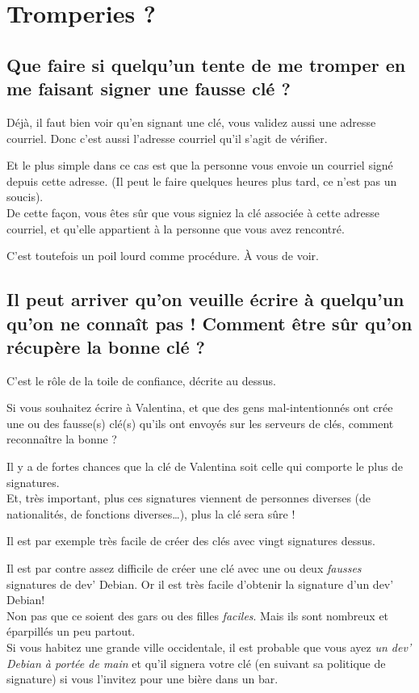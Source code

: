 \section{Tromperies ?}\label{tromperies}

\subsection{Que faire si quelqu'un tente de me tromper en me faisant
signer une fausse clé
?}\label{que-faire-si-quelquun-tente-de-me-tromper-en-me-faisant-signer-une-fausse-cluxe9}

Déjà, il faut bien voir qu'en signant une clé, vous validez aussi une
adresse courriel. Donc c'est aussi l'adresse courriel qu'il s'agit de
vérifier.

Et le plus simple dans ce cas est que la personne vous envoie un
courriel signé depuis cette adresse. (Il peut le faire quelques heures
plus tard, ce n'est pas un soucis).\\De cette façon, vous êtes sûr que
vous signiez la clé associée à cette adresse courriel, et qu'elle
appartient à la personne que vous avez rencontré.

C'est toutefois un poil lourd comme procédure. À vous de voir.

\subsection{Il peut arriver qu'on veuille écrire à quelqu'un qu'on ne
connaît pas ! Comment être sûr qu'on récupère la bonne clé
?}\label{il-peut-arriver-quon-veuille-uxe9crire-uxe0-quelquun-quon-ne-connauxeet-pas-comment-uxeatre-suxfbr-quon-ruxe9cupuxe8re-la-bonne-cluxe9}

C'est le rôle de la toile de confiance, décrite au dessus.

Si vous souhaitez écrire à Valentina, et que des gens mal-intentionnés
ont crée une ou des fausse(s) clé(s) qu'ils ont envoyés sur les serveurs
de clés, comment reconnaître la bonne ?

Il y a de fortes chances que la clé de Valentina soit celle qui comporte
le plus de signatures.\\Et, très important, plus ces signatures viennent
de personnes diverses (de nationalités, de fonctions diverses\ldots{}),
plus la clé sera sûre !

Il est par exemple très facile de créer des clés avec vingt signatures
dessus.

Il est par contre assez difficile de créer une clé avec une ou deux
\emph{fausses} signatures de dev' Debian. Or il est très facile
d'obtenir la signature d'un dev' Debian!\\Non pas que ce soient des gars
ou des filles \emph{faciles}. Mais ils sont nombreux et éparpillés un
peu partout.\\Si vous habitez une grande ville occidentale, il est
probable que vous ayez \emph{un dev' Debian à portée de main} et qu'il
signera votre clé (en suivant sa politique de signature) si vous
l'invitez pour une bière dans un bar.

